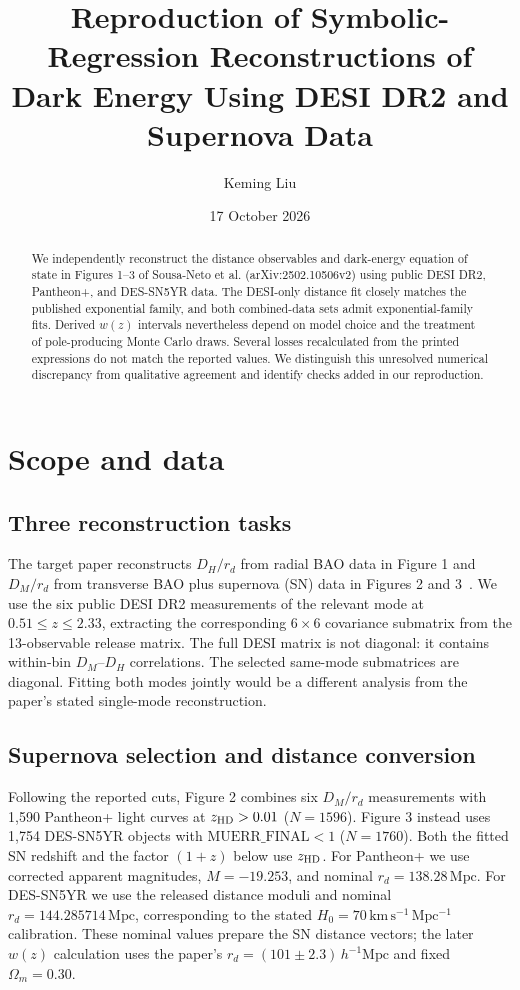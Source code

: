 \documentclass[11pt]{article}
\title{Reproduction of Symbolic-Regression Reconstructions of Dark Energy Using DESI DR2 and Supernova Data}
\author{Keming Liu}
\date{17 October 2026}
\begin{document}
\maketitle

\begin{abstract}
We independently reconstruct the distance observables and dark-energy equation of state in Figures 1--3 of Sousa-Neto et al. (arXiv:2502.10506v2) using public DESI DR2, Pantheon+, and DES-SN5YR data. The DESI-only distance fit closely matches the published exponential family, and both combined-data sets admit exponential-family fits. Derived $w(z)$ intervals nevertheless depend on model choice and the treatment of pole-producing Monte Carlo draws. Several losses recalculated from the printed expressions do not match the reported values. We distinguish this unresolved numerical discrepancy from qualitative agreement and identify checks added in our reproduction.
\end{abstract}

\section{Scope and data}
\subsection{Three reconstruction tasks}
The target paper reconstructs $D_H/r_d$ from radial BAO data in Figure 1 and $D_M/r_d$ from transverse BAO plus supernova (SN) data in Figures 2 and 3~\cite{SousaNeto2025}. We use the six public DESI DR2 measurements of the relevant mode at $0.51\leq z\leq2.33$, extracting the corresponding $6\times6$ covariance submatrix from the 13-observable release matrix. The full DESI matrix is not diagonal: it contains within-bin $D_M$--$D_H$ correlations. The selected same-mode submatrices are diagonal. Fitting both modes jointly would be a different analysis from the paper's stated single-mode reconstruction.

\subsection{Supernova selection and distance conversion}
Following the reported cuts, Figure 2 combines six $D_M/r_d$ measurements with 1,590 Pantheon+ light curves at $z_{\rm HD}>0.01$ ($N=1596$). Figure 3 instead uses 1,754 DES-SN5YR objects with $\mathrm{MUERR\_FINAL}<1$ ($N=1760$). Both the fitted SN redshift and the factor $(1+z)$ below use $z_{\rm HD}$. For Pantheon+ we use corrected apparent magnitudes, $M=-19.253$, and nominal $r_d=138.28\,\mathrm{Mpc}$. For DES-SN5YR we use the released distance moduli and nominal $r_d=144.285714\,\mathrm{Mpc}$, corresponding to the stated $H_0=70\,\mathrm{km\,s^{-1}\,Mpc^{-1}}$ calibration. These nominal values prepare the SN distance vectors; the later $w(z)$ calculation uses the paper's $r_d=(101\pm2.3)\,h^{-1}\mathrm{Mpc}$ and fixed $\Omega_m=0.30$.
\end{document}
